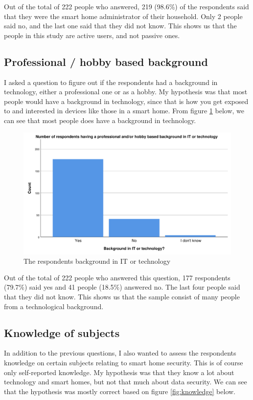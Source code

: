 Out of the total of 222 people who answered, 219 (98.6\%) of the respondents said that they were the smart home administrator of their household. Only 2 people said no, and the last one said that they did not know. This shows us that the people in this study are active users, and not passive ones. 

\subsection{Professional / hobby based background}
I asked a question to figure out if the respondents had a background in technology, either a professional one or as a hobby. My hypothesis was that most people would have a background in technology, since that is how you get exposed to and interested in devices like those in a smart home. From figure \ref{fig:background} below, we can see that most people does have a background in technology. 

\begin{figure}[H]
    \centering
    \includegraphics[scale=0.55]{figures/diagrams/background.pdf}
    \caption{The respondents background in IT or technology}
    \label{fig:background}
\end{figure}
Out of the total of 222 people who answered this question, 177 respondents (79.7\%) said yes and 41 people (18.5\%) answered no. The last four people said that they did not know. This shows us that the sample consist of many people from a technological background. 

\subsection{Knowledge of subjects}
In addition to the previous questions, I also wanted to assess the respondents knowledge on certain subjects relating to smart home security. This is of course only self-reported knowledge. My hypothesis was that they know a lot about technology and smart homes, but not that much about data security. We can see that the hypothesis was mostly correct based on figure \ref{fig:knowledge} below. 

